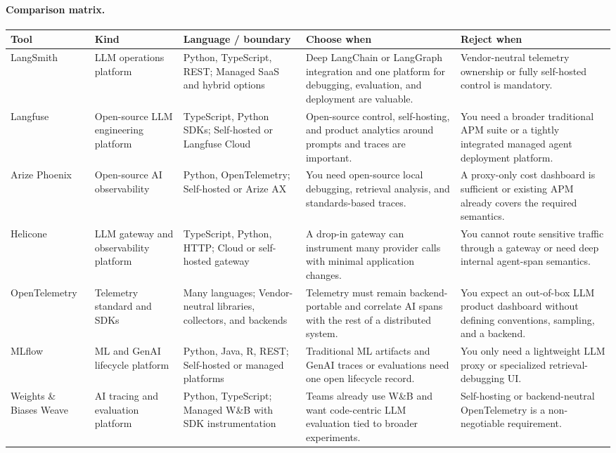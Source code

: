 \paragraph{Comparison matrix.}
\begin{longtable}{@{}p{20mm}p{22mm}p{26mm}p{46mm}p{46mm}@{}}
\toprule\textbf{Tool} & \textbf{Kind} & \textbf{Language / boundary} & \textbf{Choose when} & \textbf{Reject when}\\\midrule\endhead
LangSmith & LLM operations platform & Python, TypeScript, REST; Managed SaaS and hybrid options & Deep LangChain or LangGraph integration and one platform for debugging, evaluation, and deployment are valuable. & Vendor-neutral telemetry ownership or fully self-hosted control is mandatory.\\
Langfuse & Open-source LLM engineering platform & TypeScript, Python SDKs; Self-hosted or Langfuse Cloud & Open-source control, self-hosting, and product analytics around prompts and traces are important. & You need a broader traditional APM suite or a tightly integrated managed agent deployment platform.\\
Arize Phoenix & Open-source AI observability & Python, OpenTelemetry; Self-hosted or Arize AX & You need open-source local debugging, retrieval analysis, and standards-based traces. & A proxy-only cost dashboard is sufficient or existing APM already covers the required semantics.\\
Helicone & LLM gateway and observability platform & TypeScript, Python, HTTP; Cloud or self-hosted gateway & A drop-in gateway can instrument many provider calls with minimal application changes. & You cannot route sensitive traffic through a gateway or need deep internal agent-span semantics.\\
OpenTelemetry & Telemetry standard and SDKs & Many languages; Vendor-neutral libraries, collectors, and backends & Telemetry must remain backend-portable and correlate AI spans with the rest of a distributed system. & You expect an out-of-box LLM product dashboard without defining conventions, sampling, and a backend.\\
MLflow & ML and GenAI lifecycle platform & Python, Java, R, REST; Self-hosted or managed platforms & Traditional ML artifacts and GenAI traces or evaluations need one open lifecycle record. & You only need a lightweight LLM proxy or specialized retrieval-debugging UI.\\
Weights \& Biases Weave & AI tracing and evaluation platform & Python, TypeScript; Managed W\&B with SDK instrumentation & Teams already use W\&B and want code-centric LLM evaluation tied to broader experiments. & Self-hosting or backend-neutral OpenTelemetry is a non-negotiable requirement.\\

\end{longtable}
